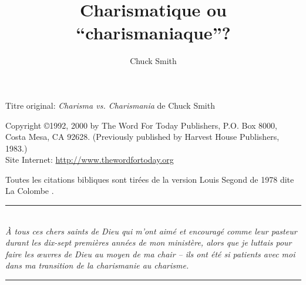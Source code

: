 \documentclass[paper=6.13in:9.21in,pagesize=pdftex,12pt,DIV=calc]{scrbook}
\title{Charismatique ou ``charismaniaque''?}
\author{Chuck Smith}
\begin{document}
\pagestyle{empty}

\maketitle

\newpage
\mbox{}


\newpage
Titre original: \emph{Charisma vs. Charismania}
de Chuck Smith

Copyright \copyright 1992, 2000 by The Word For Today Publishers, P.O. Box 8000, \\
Costa Mesa, CA 92628. (Previously published by Harvest House Publishers, 1983.) \\
Site Internet: \url{http://www.thewordfortoday.org}

Toutes les citations bibliques sont tirées de la version Louis Segond de 1978 dite \og La Colombe \fg{}.


\newcommand{\HRule}{\rule{\linewidth}{0.5mm}}
\newpage
\mbox{}
\vfill
\begin{center}
\HRule \\[0.4cm]
\emph{À tous ces chers saints de Dieu qui m'ont aimé et encouragé comme leur pasteur durant les dix-sept premières années de mon ministère, alors que je luttais pour faire les œuvres de Dieu au moyen de ma chair -- ils ont été si patients avec moi dans ma transition de la charismanie au charisme.}
\HRule \\[1.5cm]
\end{center}
\vfill
\mbox{}
\newpage



\tableofcontents

\pagestyle{headings}







\printindex
\end{document}
